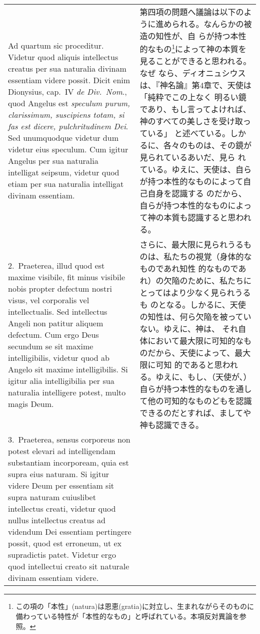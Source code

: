 \documentclass[10pt]{jsarticle} %
\begin{document}
\begin{longtable}{p{21em}p{21em}}

{\sc Ad quartum sic proceditur}. Videtur quod aliquis intellectus
creatus per sua naturalia divinam essentiam videre possit. Dicit enim
Dionysius, cap.\ IV {\it de Div.\ Nom}., quod Angelus est {\it
speculum purum, clarissimum, suscipiens totam, si fas est dicere,
pulchritudinem Dei}. Sed unumquodque videtur dum videtur eius
speculum. Cum igitur Angelus per sua naturalia intelligat seipsum,
videtur quod etiam per sua naturalia intelligat divinam essentiam.

&

第四項の問題へ議論は以下のように進められる。なんらかの被造の知性が、自
らが持つ本性的なもの\footnote{この項の「本性」(natura)は恩恵(gratia)に対立し、生まれながらそのものに備わっている特性が「本性的なもの」と呼ばれている。本項反対異論を参照。}によって神の本質を見ることができると思われる。なぜ
なら、ディオニュシウスは、『神名論』第4章で、天使は「純粋でこの上なく
明るい鏡であり、もし言ってよければ、神のすべての美しさを受け取っている」
と述べている。しかるに、各々のものは、その鏡が見られているあいだ、見ら
れている。ゆえに、天使は、自らが持つ本性的なものによって自己自身を認識する
のだから、自らが持つ本性的なものによって神の本質も認識すると思われる。

\\

2.~{\sc Praeterea}, illud quod est maxime visibile, fit minus visibile
nobis propter defectum nostri visus, vel corporalis vel
intellectualis. Sed intellectus Angeli non patitur aliquem
defectum. Cum ergo Deus secundum se sit maxime intelligibilis, videtur
quod ab Angelo sit maxime intelligibilis. Si igitur alia
intelligibilia per sua naturalia intelligere potest, multo magis Deum.

&

さらに、最大限に見られうるものは、私たちの視覚（身体的なものであれ知性
的なものであれ）の欠陥のために、私たちにとってはより少なく見られうるも
のとなる。しかるに、天使の知性は、何ら欠陥を被っていない。ゆえに、神は、
それ自体において最大限に可知的なものだから、天使によって、最大限に可知
的であると思われる。ゆえに、もし、（天使が、）自らが持つ本性的なものを通し
て他の可知的なものどもを認識できるのだとすれば、ましてや神も認識できる。

\\

3.~{\sc Praeterea}, sensus corporeus non potest elevari ad
intelligendam substantiam incorpoream, quia est supra eius naturam. Si
igitur videre Deum per essentiam sit supra naturam cuiuslibet
intellectus creati, videtur quod nullus intellectus creatus ad
videndum Dei essentiam pertingere possit, quod est erroneum, ut ex
supradictis patet. Videtur ergo quod intellectui creato sit naturale
divinam essentiam videre.


\end{longtable}
\end{document}
